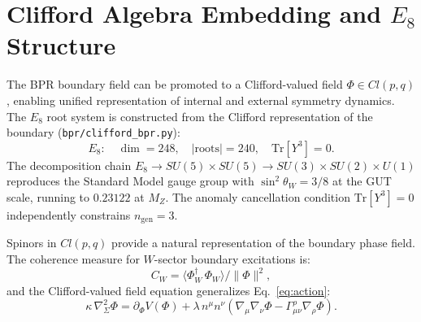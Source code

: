 \documentclass[aps,prd,twocolumn,superscriptaddress,longbibliography,nofootinbib]{revtex4-2}
\newcommand{\sinW}{\sin^2\!\theta_W}
\newcommand{\MZ}{M_Z}
\begin{document}
\section{Clifford Algebra Embedding and $E_8$ Structure}
\label{app:clifford}

The BPR boundary field can be promoted to a Clifford-valued field
$\Phi \in Cl(p,q)$, enabling unified representation of internal and
external symmetry dynamics.  The $E_8$ root system is constructed from
the Clifford representation of the boundary
(\texttt{bpr/clifford\_bpr.py}):
\begin{equation}
E_8:\quad \dim = 248,\quad |\mathrm{roots}| = 240,\quad
\mathrm{Tr}[Y^3] = 0.
\end{equation}
The decomposition chain
$E_8 \to SU(5)\times SU(5) \to SU(3)\times SU(2)\times U(1)$
reproduces the Standard Model gauge group with $\sinW = 3/8$ at the GUT
scale, running to $0.23122$ at $\MZ$.  The anomaly cancellation condition
$\mathrm{Tr}[Y^3] = 0$ independently constrains $n_{\mathrm{gen}} = 3$.

Spinors in $Cl(p,q)$ provide a natural representation of the boundary
phase field.  The coherence measure for $W$-sector boundary excitations is:
\begin{equation}
C_W = \langle\Phi_W^\dagger\,\Phi_W\rangle / \|\Phi\|^2,
\end{equation}
and the Clifford-valued field equation generalizes Eq.~\eqref{eq:action}:
\begin{equation}
\kappa\,\nabla^2_\Sigma\Phi
= \partial_\Phi V(\Phi) + \lambda\,n^\mu n^\nu
  (\nabla_\mu\nabla_\nu\Phi - \Gamma^\rho_{\mu\nu}\nabla_\rho\Phi).
\end{equation}
\end{document}
